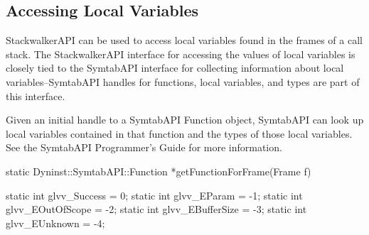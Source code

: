 


\subsection{Accessing Local Variables}
	
StackwalkerAPI can be used to access local variables found in the frames of a
call stack. The StackwalkerAPI interface for accessing the values of local
variables is closely tied to the SymtabAPI interface for collecting information
about local variables--SymtabAPI handles for functions, local variables, and
types are part of this interface. 

Given an initial handle to a SymtabAPI Function object, SymtabAPI can look up
local variables contained in that function and the types of those local
variables. See the SymtabAPI Programmer's Guide for more information.

\begin{apient}
static Dyninst::SymtabAPI::Function *getFunctionForFrame(Frame f)
\end{apient}

\begin{apient}
static int glvv_Success = 0;
static int glvv_EParam = -1;
static int glvv_EOutOfScope = -2;
static int glvv_EBufferSize = -3;
static int glvv_EUnknown = -4;
\end{apient}

